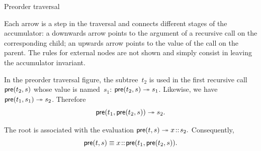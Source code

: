 %
\begin{frame}{Preorder traversal}

  Each arrow is a step in the traversal and connects different stages
  of the accumulator: a downwards arrow points to the argument of a
  recursive call on the corresponding child; an upwards arrow points
  to the value of the call on the parent. The rules for external
  nodes are not shown and simply consist in leaving the accumulator
  invariant.

  \bigskip

  In the preorder traversal figure, the subtree~\(t_2\) is used in the
  first recursive call \(\textsf{pre}(t_2, s)\) whose value is
  named~\(s_1\): \(\textsf{pre}(t_2, s) \twoheadrightarrow s_1\).
  Likewise, we have \(\textsf{pre}(t_1, s_1) \twoheadrightarrow
  s_2\). Therefore
  \begin{equation*}
    \textsf{pre}(t_1, \textsf{pre}(t_2, s)) \twoheadrightarrow s_2.
  \end{equation*}

  The root is associated with the evaluation
  $\textsf{pre}(t, s) \twoheadrightarrow {x}\!::\!{s_2}.$
  Consequently,
  \begin{equation*}
    \textsf{pre}(t, s) \equiv {x}\!::\!{\textsf{pre}(t_1, \textsf{pre}(t_2, s))}.
  \end{equation*}

\end{frame}

